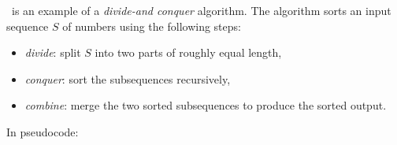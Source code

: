 \documentclass[12pt,answers]{exam}
\begin{document}
\pagestyle{headandfoot}
\runningfootrule
{}
\runningheader{}{}{}
\firstpagefooter{}{}{}

\begin{questions}

\question
\mergesort\ is an example of a {\em divide-and conquer} algorithm. The algorithm
sorts an input sequence $S$ of numbers using the following steps:
%
\begin{itemize}
\item {\em divide}: split $S$ into two parts of roughly equal length,
\item {\em conquer}: sort the subsequences recursively,
\item {\em combine}: merge the two sorted subsequences to produce the sorted output.
\end{itemize}
%
In pseudocode:
%
\begin{center}
  \begin{minipage}{.5\linewidth}
    \begin{algorithm}[H]
      \label{alg:merge-sort}
%
      \DontPrintSemicolon
      \SetAlCapHSkip{0ex}
%
      \caption{\mergesort($S$, $p$, $r$)}
      \vspace{.5em}
%
%
      \vspace{.5em}
%
    \end{algorithm}
  \end{minipage}
\end{center}
%
\end{questions}
\end{document}
